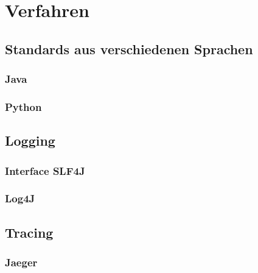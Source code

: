 \chapter{Verfahren}\label{ch:verfahren}


\section{Standards aus verschiedenen Sprachen}\label{sec:standards-aus-verschiedenen-sprachen}

\subsection{Java}\label{subsec:java}


\subsection{Python}\label{subsec:python}



\section{Logging}\label{sec:logging}

\subsection{Interface SLF4J}\label{subsec:interface-slf4j}

\subsection{Log4J}\label{subsec:log4j}


\section{Tracing}\label{sec:tracing}

\subsection{Jaeger}\label{subsec:jaeger}


